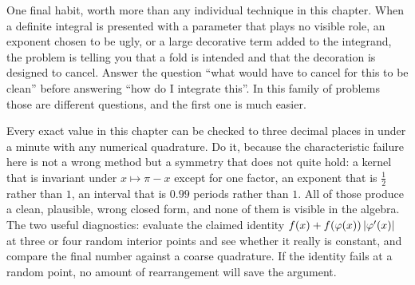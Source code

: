 One final habit, worth more than any individual technique in this chapter. When a definite integral is presented with a parameter that plays no visible role, an exponent chosen to be ugly, or a large decorative term added to the integrand, the problem is telling you that a fold is intended and that the decoration is designed to cancel. Answer the question ``what would have to cancel for this to be clean'' before answering ``how do I integrate this''. In this family of problems those are different questions, and the first one is much easier.

\begin{keynote}
Every exact value in this chapter can be checked to three decimal places in under a minute with any numerical quadrature. Do it, because the characteristic failure here is not a wrong method but a symmetry that does not quite hold: a kernel that is invariant under $x\mapsto\pi-x$ except for one factor, an exponent that is $\tfrac12$ rather than $1$, an interval that is $0.99$ periods rather than $1$. All of those produce a clean, plausible, wrong closed form, and none of them is visible in the algebra. The two useful diagnostics: evaluate the claimed identity $f(x)+f(\varphi(x))\left\lvert \varphi'(x)\right\rvert$ at three or four random interior points and see whether it really is constant, and compare the final number against a coarse quadrature. If the identity fails at a random point, no amount of rearrangement will save the argument.
\end{keynote}

